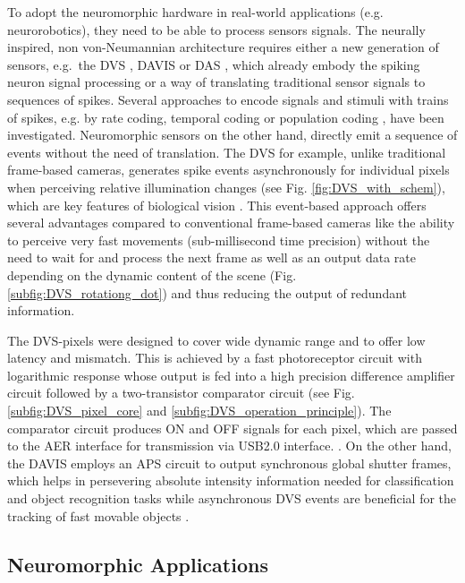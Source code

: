 To adopt the neuromorphic hardware in real-world applications (e.g. neurorobotics), they need to be able to process sensors signals.
The neurally inspired, non von-Neumannian architecture requires either a new generation of sensors, e.g.\ the \ac{DVS} \cite{Lichtsteiner2008}, \ac{DAVIS} \cite{Brandli2014} or \ac{DAS} \cite{Liu2014}, which already embody the spiking neuron signal processing or a way of translating traditional sensor signals to sequences of spikes.
Several approaches to encode signals and stimuli with trains of spikes, e.g. by rate coding, temporal coding \cite[Chap. 7.6]{Gerstner2014} or population coding \cite[Chap. 1]{Gerstner2002}, \cite{Ponulak2011} have been investigated.
Neuromorphic sensors on the other hand, directly emit a sequence of events without the need of translation.
The \ac{DVS} for example, unlike traditional frame-based cameras, generates spike events \cite{Lichtsteiner2008} asynchronously for individual pixels when perceiving relative illumination changes (see Fig. \ref{fig:DVS_with_schem}), which are key features of biological vision \cite{Lichtsteiner2008}.
This event-based approach offers several advantages compared to conventional frame-based cameras like the ability to perceive very fast movements (sub-millisecond time precision) without the need to wait for and process the next frame as well as an output data rate depending on the dynamic content of the scene (Fig. \ref{subfig:DVS_rotationg_dot}) and thus reducing the output of redundant information.

The \ac{DVS}-pixels were designed to cover wide dynamic range and to offer low latency and mismatch.
This is achieved by a fast photoreceptor circuit with logarithmic response whose output is fed into a high precision difference amplifier circuit followed by a two-transistor comparator circuit (see Fig. \ref{subfig:DVS_pixel_core} and \ref{subfig:DVS_operation_principle}).
The comparator circuit produces ON and OFF signals for each pixel, which are passed to the \ac{AER} interface for transmission via USB2.0 interface. \cite{Lichtsteiner2008}.
On the other hand, the \ac{DAVIS} employs an \ac{APS} circuit to output synchronous global shutter frames, which helps in persevering absolute intensity information needed for classification and object recognition tasks while asynchronous \ac{DVS} events are beneficial for the tracking of fast movable objects \cite{Brandli2014}.


\subsection{Neuromorphic Applications}
\label{subsec:neuro_applic}

